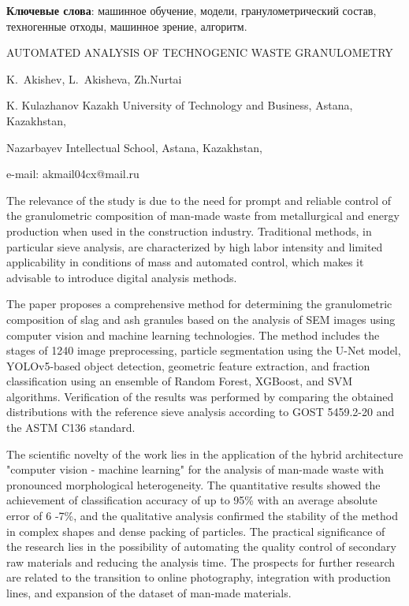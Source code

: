 {\bfseries Ключевые слова}: машинное обучение, модели, гранулометрический
состав, техногенные отходы, машинное зрение, алгоритм.

\begin{header}
AUTOMATED ANALYSIS OF TECHNOGENIC WASTE GRANULOMETRY

K.~Akishev\envelope,
L.~Akisheva,
Zh.Nurtai
\end{header}

\begin{affil}
K. Kulazhanov Kazakh University of Technology and Business, Astana, Kazakhstan,

Nazarbayev Intellectual School, Astana, Kazakhstan,

e-mail: akmail04cx@mail.ru
\end{affil}

The relevance of the study is due to the need for prompt and reliable
control of the granulometric composition of man-made waste from
metallurgical and energy production when used in the construction
industry. Traditional methods, in particular sieve analysis, are
characterized by high labor intensity and limited applicability in
conditions of mass and automated control, which makes it advisable to
introduce digital analysis methods.

The paper proposes a comprehensive method for determining the
granulometric composition of slag and ash granules based on the analysis
of SEM images using computer vision and machine learning technologies.
The method includes the stages of 1240 image preprocessing, particle
segmentation using the U-Net model, YOLOv5-based object detection,
geometric feature extraction, and fraction classification using an
ensemble of Random Forest, XGBoost, and SVM algorithms. Verification of
the results was performed by comparing the obtained distributions with
the reference sieve analysis according to GOST 5459.2-20 and the ASTM
C136 standard.

The scientific novelty of the work lies in the application of the hybrid
architecture "computer vision - machine learning" for the analysis of
man-made waste with pronounced morphological heterogeneity. The
quantitative results showed the achievement of classification accuracy
of up to 95\% with an average absolute error of 6 -7\%, and the
qualitative analysis confirmed the stability of the method in complex
shapes and dense packing of particles. The practical significance of the
research lies in the possibility of automating the quality control of
secondary raw materials and reducing the analysis time. The prospects
for further research are related to the transition to online
photography, integration with production lines, and expansion of the
dataset of man-made materials.

